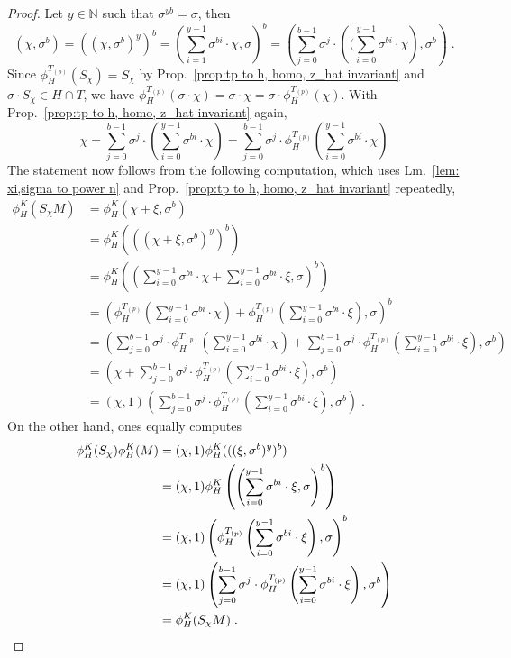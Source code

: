 \documentclass[aps,pra,letterpaper,onrcolumn,nofootinbib,notitlepage,longbibliography]{revtex4-1}
\begin{document}
\begin{proof}
    Let $y\in\mathbb{N}$ such that $\sigma^{yb}=\sigma$, then
    $$(\chi,\sigma^b)=((\chi,\sigma^b)^y)^b=\left(\sum_{i=1}^{y-1}\sigma^{bi}\cdot\chi,\sigma\right)^b=\left(\sum_{j=0}^{b-1}\sigma^j\cdot\left((\sum_{i=0}^{y-1}\sigma^{bi}\cdot\chi\right),\sigma^b\right)\; .$$
    Since $\phi^{T_{(p)}}_H(S_\chi)=S_\chi$ by Prop.~\ref{prop:tp to h, homo, z_hat invariant} and $\sigma\cdot S_\chi\in H\cap T$, we have $\phi^{T_{(p)}}_H(\sigma\cdot\chi)=\sigma\cdot\chi=\sigma\cdot\phi^{T_{(p)}}_H(\chi)$. With Prop.~\ref{prop:tp to h, homo, z_hat invariant} again,
    $$
    \chi=\sum_{j=0}^{b-1}\sigma^j\cdot\left(\sum_{i=0}^{y-1}\sigma^{bi}\cdot\chi\right)=\sum_{j=0}^{b-1}\sigma^j\cdot\phi^{T_{(p)}}_H\left(\sum_{i=0}^{y-1}\sigma^{bi}\cdot\chi\right)
    $$
    The statement now follows from the following computation, which uses Lm.~\ref{lem: xi,sigma to power n} and Prop.~\ref{prop:tp to h, homo, z_hat invariant} repeatedly,
    \begin{align*}
        \phi^K_H(S_\chi M)
        &=\phi^K_H(\chi+\xi,\sigma^b)\\
        &=\phi^K_H(((\chi+\xi,\sigma^b)^y)^b)\\
        &=\phi^K_H\left(\left(\sum_{i=0}^{y-1}\sigma^{bi}\cdot\chi+\sum_{i=0}^{y-1}\sigma^{bi}\cdot\xi,\sigma\right)^b\right)\\
        &=\left(\phi^{T_{(p)}}_H\left(\sum_{i=0}^{y-1}\sigma^{bi}\cdot\chi\right)+\phi^{T_{(p)}}_H\left(\sum_{i=0}^{y-1}\sigma^{bi}\cdot\xi\right),\sigma\right)^b\\
        &=\left(\sum_{j=0}^{b-1}\sigma^j\cdot\phi^{T_{(p)}}_H\left(\sum_{i=0}^{y-1}\sigma^{bi}\cdot\chi\right)+\sum_{j=0}^{b-1}\sigma^j\cdot\phi^{T_{(p)}}_H\left(\sum_{i=0}^{y-1}\sigma^{bi}\cdot\xi\right),\sigma^b\right)\\
        &=\left(\chi+\sum_{j=0}^{b-1}\sigma^j\cdot\phi^{T_{(p)}}_H\left(\sum_{i=0}^{y-1}\sigma^{bi}\cdot\xi\right),\sigma^b\right)\\
        &=(\chi,1)\left(\sum_{j=0}^{b-1}\sigma^j\cdot\phi^{T_{(p)}}_H\left(\sum_{i=0}^{y-1}\sigma^{bi}\cdot\xi\right),\sigma^b\right)\; .
    \end{align*}
    On the other hand, ones equally computes
    \begin{align*}
        \phi^K_H(S_\chi)\phi^K_H(M)
        &=(\chi,1)\phi^K_H(((\xi,\sigma^b)^y)^b)\\
        &=(\chi,1)\phi^K_H\left(\left(\sum_{i=0}^{y-1}\sigma^{bi}\cdot\xi,\sigma\right)^b\right)\\
        &=(\chi,1)\left(\phi^{T_{(p)}}_H\left(\sum_{i=0}^{y-1}\sigma^{bi}\cdot\xi\right),\sigma\right)^b\\
        &=(\chi,1)\left(\sum_{j=0}^{b-1}\sigma^j\cdot\phi^{T_{(p)}}_H\left(\sum_{i=0}^{y-1}\sigma^{bi}\cdot\xi\right),\sigma^b\right)\\
        &=\phi^K_H(S_\chi M)\; .\qedhere
    \end{align*}
\end{proof}
\end{document}
